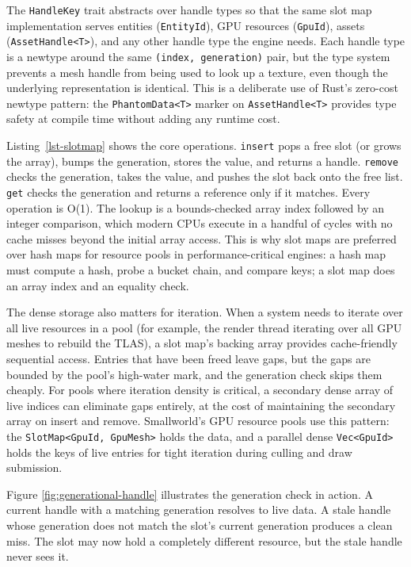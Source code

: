 \documentclass[
  11pt,
  letterpaper,
  DIV=11,
  numbers=noendperiod,
  twoside,
  open=right]{scrreprt}
\begin{document}
The \texttt{HandleKey} trait abstracts over handle types so that the
same slot map implementation serves entities (\texttt{EntityId}), GPU
resources (\texttt{GpuId}), assets
(\texttt{AssetHandle\textless{}T\textgreater{}}), and any other handle
type the engine needs. Each handle type is a newtype around the same
\texttt{(index,\ generation)} pair, but the type system prevents a mesh
handle from being used to look up a texture, even though the underlying
representation is identical. This is a deliberate use of Rust's
zero-cost newtype pattern: the
\texttt{PhantomData\textless{}T\textgreater{}} marker on
\texttt{AssetHandle\textless{}T\textgreater{}} provides type safety at
compile time without adding any runtime cost.

Listing~\ref{lst-slotmap} shows the core operations. \texttt{insert}
pops a free slot (or grows the array), bumps the generation, stores the
value, and returns a handle. \texttt{remove} checks the generation,
takes the value, and pushes the slot back onto the free list.
\texttt{get} checks the generation and returns a reference only if it
matches. Every operation is O(1). The lookup is a bounds-checked array
index followed by an integer comparison, which modern CPUs execute in a
handful of cycles with no cache misses beyond the initial array access.
This is why slot maps are preferred over hash maps for resource pools in
performance-critical engines: a hash map must compute a hash, probe a
bucket chain, and compare keys; a slot map does an array index and an
equality check.

The dense storage also matters for iteration. When a system needs to
iterate over all live resources in a pool (for example, the render
thread iterating over all GPU meshes to rebuild the TLAS), a slot map's
backing array provides cache-friendly sequential access. Entries that
have been freed leave gaps, but the gaps are bounded by the pool's
high-water mark, and the generation check skips them cheaply. For pools
where iteration density is critical, a secondary dense array of live
indices can eliminate gaps entirely, at the cost of maintaining the
secondary array on insert and remove. Smallworld's GPU resource pools
use this pattern: the
\texttt{SlotMap\textless{}GpuId,\ GpuMesh\textgreater{}} holds the data,
and a parallel dense \texttt{Vec\textless{}GpuId\textgreater{}} holds
the keys of live entries for tight iteration during culling and draw
submission.

Figure \ref{fig:generational-handle} illustrates the generation check in
action. A current handle with a matching generation resolves to live
data. A stale handle whose generation does not match the slot's current
generation produces a clean miss. The slot may now hold a completely
different resource, but the stale handle never sees it.
\end{document}
